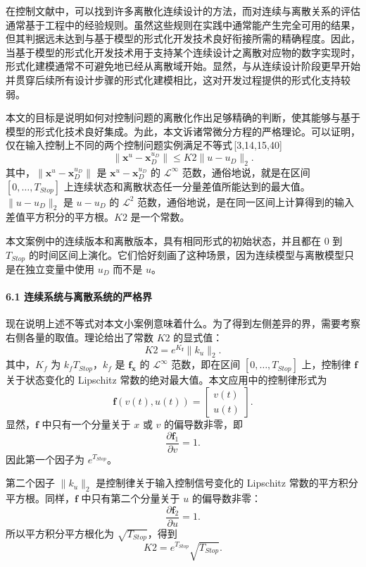 {\indent 在控制文献中，可以找到许多离散化连续设计的方法，而对连续与离散关系的评估通常基于工程中的经验规则。虽然这些规则在实践中通常能产生完全可用的结果，但其判据远未达到与基于模型的形式化开发技术良好衔接所需的精确程度。因此，当基于模型的形式化开发技术用于支持某个连续设计之离散对应物的数字实现时，形式化建模通常不可避免地已经从离散域开始。显然，与从连续设计阶段更早开始并贯穿后续所有设计步骤的形式化建模相比，这对开发过程提供的形式化支持较弱。

\indent 本文的目标是说明如何对控制问题的离散化作出足够精确的判断，使其能够与基于模型的形式化技术良好集成。为此，本文诉诸常微分方程的严格理论。可以证明，仅在输入控制上不同的两个控制问题实例满足不等式\,[3,14,15,40]
\[
\|\mathbf{x}^{u}-\mathbf{x}_{D}^{u_D}\|\leq K2\|u-u_D\|_2 .
\]
其中，$\|\mathbf{x}^{u}-\mathbf{x}_{D}^{u_D}\|$ 是 $\mathbf{x}^{u}-\mathbf{x}_{D}^{u_D}$ 的 $\mathcal{L}^{\infty}$ 范数，通俗地说，就是在区间 $[0,\ldots,T_{Stop}]$ 上连续状态和离散状态任一分量差值所能达到的最大值。$\|u-u_D\|_2$ 是 $u-u_D$ 的 $\mathcal{L}^{2}$ 范数，通俗地说，是在同一区间上计算得到的输入差值平方积分的平方根。$K2$ 是一个常数。

\indent 本文案例中的连续版本和离散版本，具有相同形式的初始状态，并且都在 $0$ 到 $T_{Stop}$ 的时间区间上演化。它们恰好刻画了这种场景，因为连续模型与离散模型只是在独立变量中使用 $u_D$ 而不是 $u$。

\paragraph{6.1 连续系统与离散系统的严格界}

\indent 现在说明上述不等式对本文小案例意味着什么。为了得到左侧差异的界，需要考察右侧各量的取值。理论给出了常数 $K2$ 的显式值：
\[
K2=e^{K_{\mathbf{f}}}\|k_u\|_2 .
\]
其中，$K_f$ 为 $k_fT_{Stop}$，$k_f$ 是 $\mathbf{f}_{\mathbf{x}}$ 的 $\mathcal{L}^{\infty}$ 范数，即在区间 $[0,\ldots,T_{Stop}]$ 上，控制律 $\mathbf{f}$ 关于状态变化的 Lipschitz 常数的绝对最大值。本文应用中的控制律形式为
\[
\mathbf{f}(v(t),u(t))=
\begin{bmatrix}
v(t)\\
u(t)
\end{bmatrix}.
\]
显然，$\mathbf{f}$ 中只有一个分量关于 $x$ 或 $v$ 的偏导数非零，即
\[
\frac{\partial \mathbf{f}_1}{\partial v}=1 .
\]
因此第一个因子为 $e^{T_{Stop}}$。

\indent 第二个因子 $\|k_u\|_2$ 是控制律关于输入控制信号变化的 Lipschitz 常数的平方积分平方根。同样，$\mathbf{f}$ 中只有第二个分量关于 $u$ 的偏导数非零：
\[
\frac{\partial \mathbf{f}_2}{\partial u}=1 .
\]
所以平方积分平方根化为 $\sqrt{T_{Stop}}$，得到
\[
K2=e^{T_{Stop}}\sqrt{T_{Stop}} .
\]

}
